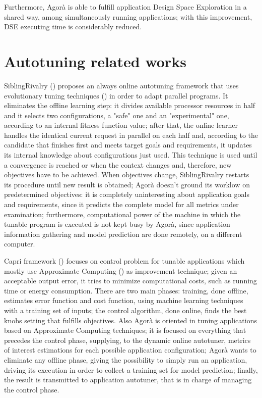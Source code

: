 Furthermore, Agorà is able to fulfill application Design Space Exploration in a shared way, among simultaneously running applications; with this improvement, DSE executing time is considerably reduced. 

\section{Autotuning related works}

SiblingRivalry (\cite{ansel2012siblingrivalry}) proposes an always online autotuning framework that uses evolutionary tuning techniques (\cite{coello2007evolutionary}) in order to adapt parallel programs. It eliminates the offline learning step: it divides available processor resources in half and it selects two configurations, a "safe" one and an "experimental" one, according to an internal fitness function value; after that, the online learner handles the identical current request in parallel on each half and, according to the candidate that finishes first and meets target goals and requirements, it updates its internal knowledge about configurations just used. This technique is used until a convergence is reached or when the context changes and, therefore, new objectives have to be achieved. When objectives change, SiblingRivalry restarts its procedure until new result is obtained; Agorà doesn't ground its worklow on predetermined objectives: it is completely uninteresting about application goals and requirements, since it predicts the complete model for all metrics under examination; furthermore, computational power of the machine in which the tunable program is executed is not kept busy by Agorà, since application information gathering and model prediction are done remotely, on a different computer.

Capri framework (\cite{sui2016proactive}) focuses on control problem for tunable applications which mostly use Approximate Computing (\cite{mittal2016survey}) as improvement technique; given an acceptable output error, it tries to minimize computational costs, such as running time or energy consumption. There are two main phases: training, done offline, estimates error function and cost function, using machine learning techniques with a training set of inputs; the control algorithm, done online, finds the best knobs setting that fulfills objectives. Also Agorà is oriented in tuning applications based on Approximate Computing techniques; it is focused on everything that precedes the control phase, supplying, to the dynamic online autotuner, metrics of interest estimations for each possible application configuration; Agorà wants to eliminate any offline phase, giving the possibility to simply run an application, driving its execution in order to collect a training set for model prediction; finally, the result is transmitted to application autotuner, that is in charge of managing the control phase.

